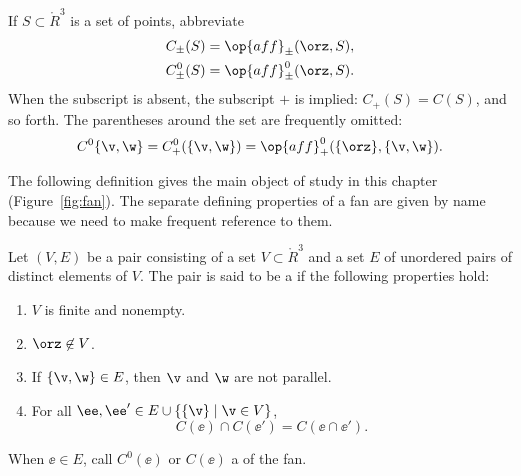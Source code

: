 

If $S\subset\ring{R}^3$ is a set of points,
abbreviate
\begin{align*}
C_\pm(S) &= \op{aff}_\pm(\orz,S),\\
C^0_\pm(S) &= \op{aff}^0_\pm(\orz,S).\\
\end{align*}
When the subscript is absent, the subscript $+$ is implied: $C_+(S)
= C(S)$, and so forth.  The parentheses around the set are frequently
omitted:
\[ C^0\{\v,\w\}=C^0_+(\{\v,\w\}) =
\op{aff}^0_+(\{\orz\},\{\v,\w\}).\] 
%

The following definition gives the main object of study in this
chapter (Figure~\ref{fig:fan}).  The separate defining properties of a
fan are given by name because we need to make frequent reference to
them.

\begin{definition}
Let $(V,E)$ be a pair consisting of a set $V\subset \ring{R}^3$ and
a set $E$ of unordered pairs of distinct elements of $V$.  The pair
is said to be a  if the following properties hold:
\begin{enumerate}
\item {} $V$ is finite and  nonempty.
\item {} $\orz\not\in V$.
\item {} If $\{\v,\w\} \in E$, then $\v$ and $\w$
are not parallel.
\item {}
For all $\ee ,\ee '\in E \cup \{\{\v\}\mid \v\in V\}$, 
\[ C(\ee )\cap C(\ee ') = C(\ee \cap \ee
').\] 
\end{enumerate}
When $\ee\in E$, call $C^0(\ee)$ or $C(\ee)$ a 
of the fan.
\end{definition}
%
%
%

\figIIAHJXI %

